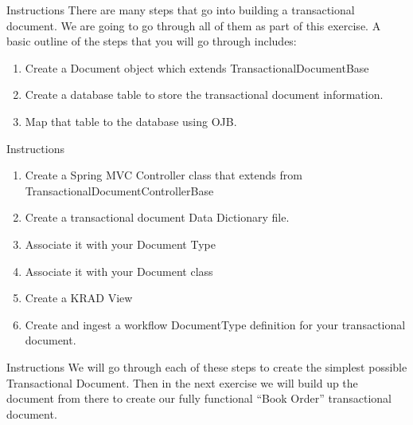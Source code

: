 \documentclass[xcolor=dvipsnames,14pt,professionalfonts]{beamer}
\begin{document}
\begin{frame}{Instructions}
 There are many steps that go into building a transactional document.  We are going to go through all of them as part of this exercise.  A basic outline of the steps that you will go through includes:
 \begin{enumerate}
   \item Create a Document object which extends TransactionalDocumentBase
   \item Create a database table to store the transactional document information.
   \item Map that table to the database using OJB.
   \end{enumerate}
\end{frame}

\begin{frame}{Instructions}
 \begin{enumerate}
   \item Create a Spring MVC Controller class that extends from TransactionalDocumentControllerBase
   \item Create a transactional document Data Dictionary file.
   \item Associate it with your Document Type
   \item Associate it with your Document class
   \item Create a KRAD View 
   \item Create and ingest a workflow DocumentType definition for your transactional document.
   \end{enumerate}
\end{frame}

\begin{frame}{Instructions}
      We will go through each of these steps to create the simplest possible Transactional Document.  Then in the next exercise we will build up the document from there to create our fully functional “Book Order” transactional document. 
\end{frame}
\end{document}
